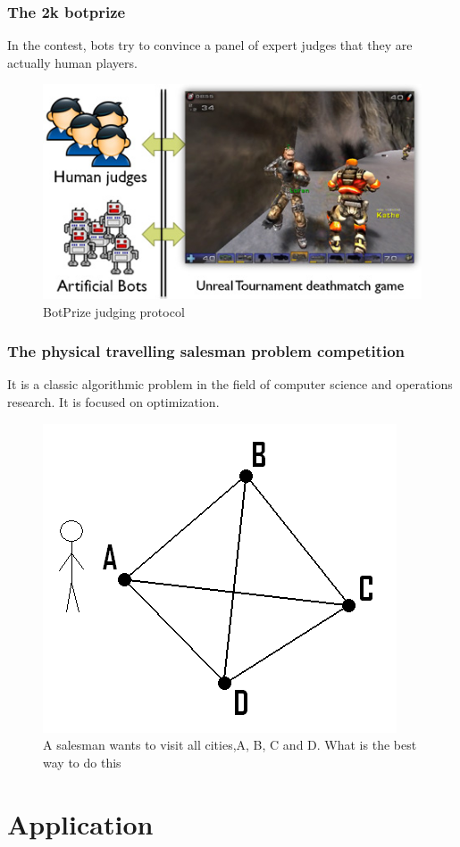 \documentclass{beamer}
\begin{document}
\begin{frame}
  \frametitle{The 2k botprize\cite{3}}
  In the contest, bots try to convince a panel of expert judges that they are actually human players.
  \begin{figure}
    \includegraphics[width=1\linewidth]{figures/botprize}
    \caption{BotPrize judging protocol}
  \end{figure}
\end{frame}

\begin{frame}
  \frametitle{The physical travelling salesman problem competition\cite{4}}
  It is a classic algorithmic problem in the field of computer science and operations research. It is focused on optimization.
  \begin{figure}
    \includegraphics[width=0.6\linewidth]{figures/salesman}
    \caption{A salesman wants to visit all cities,A, B, C and D. What is the best way to do this}
  \end{figure}
\end{frame}

\section{Application}
\end{document}
